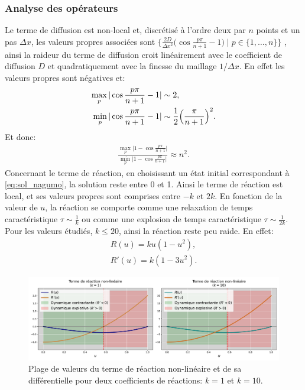 \subsubsection{Analyse des opérateurs}\label{par:analyser_operateurs_nagumo}
Le terme de diffusion est non-local et, discrétisé à l'ordre deux par $n$ points et un pas $\Delta x$, les valeurs propres associées sont 
$\{ \frac{2D}{\Delta x^2} \bigl(\cos \frac{p\pi}{n+1} - 1\bigr) \mid p \in \{1,\dots,n\}\}$ \cite{bouchet2020laplacien}, 
ainsi la raideur du terme de diffusion croit linéairement avec le coefficient de diffusion $D$ et quadratiquement avec la finesse du maillage $1/\Delta x$.
En effet les valeurs propres sont négatives et:
\begin{align}
    \max_p \vert\cos \frac{p\pi}{n+1} - 1 \vert &\sim 2,\\
    \min_p \vert \cos \frac{p\pi}{n+1} - 1 \vert &\sim \frac{1}{2}\Bigl( \frac{\pi}{n+1} \Bigr)^2.
\end{align}
Et donc:
\begin{align}
    \frac{\max_p \vert 1 - \cos \frac{p\pi}{n+1} \vert}{\min_p \vert 1 - \cos \frac{p\pi}{n+1} \vert} \approx n^2.
\end{align}
Concernant le terme de réaction, en choisissant un état initial correspondant à \ref{eq:sol_nagumo},
la solution reste entre 0 et 1. Ainsi le terme de réaction est local, et ses valeurs propres sont comprises entre $-k$ et $2k$.
En fonction de la valeur de $u$, la réaction se comporte comme une relaxation de temps caractéristique $\tau \sim \frac{1}{k}$ ou comme une explosion de temps 
caractéristique $\tau \sim \frac{1}{2k}$. Pour les valeurs étudiés, $k \leq 20$, ainsi la réaction reste peu raide.
En effet: 
\begin{align}
    R(u) = ku(1-u^2),\\
    R'(u) = k (1 - 3u^2).
\end{align}

\begin{figure}[htbp]
    \centering
    \includegraphics[width=\textwidth]{media/4_travail/2_nagumo/raideur_reaction_nagumo.pdf}
    \caption{Plage de valeurs du terme de réaction non-linéaire et de sa différentielle pour deux coefficients de réactions: $k=1$ et $k=10$.}
    \label{fig:raideur_reaction_nagumo}
\end{figure}


